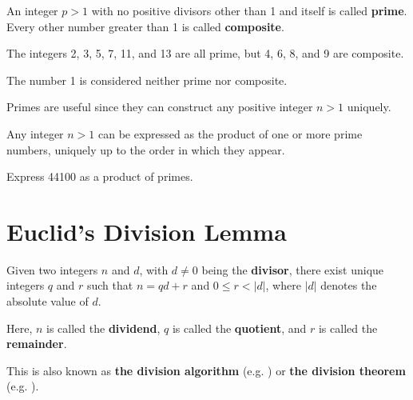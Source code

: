 \begin{definition}
    An integer $p > 1$ with no positive divisors other than 1 and itself is called \textbf{prime}. Every other number greater than 1 is called \textbf{composite}.
\end{definition}
\begin{example}
    The integers 2, 3, 5, 7, 11, and 13 are all prime, but 4, 6, 8, and 9 are composite.
\end{example}
\begin{remark}
    The number 1 is considered neither prime nor composite.
\end{remark}

\newpage

Primes are useful since they can construct any positive integer $n>1$ uniquely.

\begin{theorem}\label{thrm-fundamental-theorem-of-arithmetic}
    Any integer $n > 1$ can be expressed as the product of one or more prime numbers, uniquely up to the order in which they appear.
\end{theorem}

\begin{exercise}
    Express 44100 as a product of primes.
\end{exercise}

\section{Euclid's Division Lemma}
\begin{lemma}\label{lemma-euclid-division}
    Given two integers $n$ and $d$, with $d \neq 0$ being the \textbf{divisor}, there exist unique integers $q$ and $r$ such that $n = qd + r$ and $0 \leq r < |d|$, where $|d|$ denotes the absolute value of $d$.

    Here, $n$ is called the \textbf{dividend}, $q$ is called the \textbf{quotient}, and $r$ is called the \textbf{remainder}.
\end{lemma}
\begin{remark}
    This is also known as \textbf{the division algorithm} (e.g. \cite[p.~4]{dummit_foote_2004}) or \textbf{the division theorem} (e.g. \cite[\S 21]{clark_1984}).
\end{remark}

